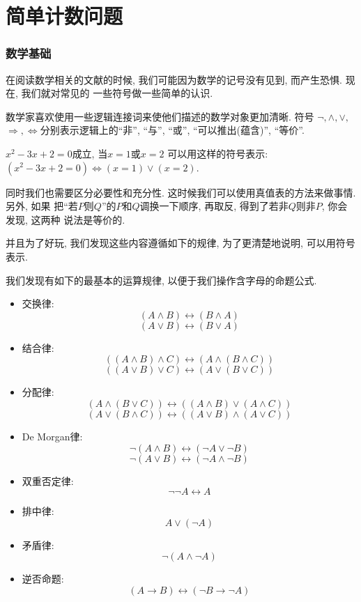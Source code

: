 \part{简单计数问题}

\section{数学基础} 

在阅读数学相关的文献的时候, 我们可能因为数学的记号没有见到, 而产生恐惧. 现在, 我们就对常见的
一些符号做一些简单的认识. 

 数学家喜欢使用一些逻辑连接词来使他们描述的数学对象更加清晰. 符号
$\lnot, \land, \lor,$ $\Rightarrow, \Leftrightarrow$分别表示逻辑上的``非'', ``与'',
``或'', ``可以推出(蕴含)'', ``等价''. 

\begin{example}
    $x^2-3x+2=0$成立, 当$x=1$或$x=2$
    可以用这样的符号表示: $(x^2-3x+2=0) \Leftrightarrow (x=1) \lor (x=2)$. 
\end{example}

同时我们也需要区分必要性和充分性. 这时候我们可以使用真值表的方法来做事情. 另外, 如果
把``若$P$则$Q$''的$P$和$Q$调换一下顺序, 再取反, 得到了$若非Q则非P$, 你会发现, 这两种
说法是等价的. 

并且为了好玩, 我们发现这些内容遵循如下的规律, 为了更清楚地说明, 可以用符号表示. 

\begin{theorem}[最基本的逻辑符号的运算规律]
    我们发现有如下的最基本的运算规律, 以便于我们操作含字母的命题公式. 
    \begin{itemize}[noitemsep]
    
        \item 交换律:
      \[
        (A \land B) \leftrightarrow (B \land A)
      \]
      \[
        (A \lor B) \leftrightarrow (B \lor A)
      \]
    \item 结合律:
      \[
        ((A \land B) \land C) \leftrightarrow (A \land (B \land C))
      \]
      \[
        ((A \lor B) \lor C) \leftrightarrow (A \lor (B \lor C))
      \]
    \item 分配律:
      \[
        (A \land (B \lor C)) \leftrightarrow ((A \land B) \lor (A \land C))
      \]
      \[
        (A \lor (B \land C)) \leftrightarrow ((A \lor B) \land (A \lor C))
      \]
    \item De Morgan律: 
      \[
        \lnot (A \land B) \leftrightarrow (\lnot A \lor \lnot B)
      \]
      \[
        \lnot (A \lor B) \leftrightarrow (\lnot A \land \lnot B)
      \]
      \item 双重否定律:
        \[
            \lnot \lnot A \leftrightarrow A
        \]
        \item 排中律:
        \[
            A \lor (\lnot A)
        \]
        \item 矛盾律:
        \[
            \lnot (A \land \lnot A)
        \]
        \item 逆否命题:
        \[
            (A \to B) \leftrightarrow (\lnot B \to \lnot A)
        \]
    \end{itemize}

\end{theorem}

